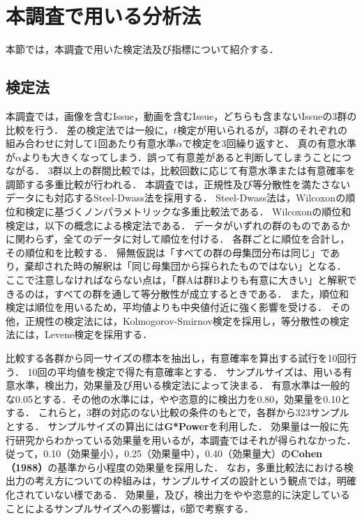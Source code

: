 \section{本調査で用いる分析法\label{method}}
本節では，本調査で用いた検定法及び指標について紹介する．

\subsection{検定法}
本調査では，画像を含むIssue，動画を含むIssue，どちらも含まないIssueの3群の比較を行う．
差の検定法では一般に，$t$検定が用いられるが，3群のそれぞれの組み合わせに対して1回あたり有意水準$\alpha$で検定を3回繰り返すと、
真の有意水準が$\alpha$よりも大きくなってしまう．誤って有意差があると判断してしまうことにつながる．
3群以上の群間比較では，比較回数に応じて有意水準または有意確率を調節する多重比較が行われる．
本調査では，正規性及び等分散性を満たさないデータにも対応するSteel-Dwass法を採用する．
Steel-Dwass法は，Wilcoxonの順位和検定に基づくノンパラメトリックな多重比較法である．
Wilcoxonの順位和検定は，以下の概念による検定法である．
データがいずれの群のものであるかに関わらず，全てのデータに対して順位を付ける．
各群ごとに順位を合計し，その順位和を比較する．
帰無仮説は「すべての群の母集団分布は同じ」であり，棄却された時の解釈は「同じ母集団から採られたものではない」となる．
ここで注意しなければならない点は，「群Aは群Bよりも有意に大きい」と解釈できるのは，すべての群を通して等分散性が成立するときである．\cite{Interpretation_For_Nonparametric_Test}
また，順位和検定は順位を用いるため，平均値よりも中央値付近に強く影響を受ける．
その他，正規性の検定法には，Kolmogorov-Smirnov検定を採用し，等分散性の検定法には，Levene検定を採用する．

比較する各群から同一サイズの標本を抽出し，有意確率を算出する試行を10回行う．
10回の平均値を検定で得た有意確率とする．
サンプルサイズは、用いる有意水準，検出力，効果量及び用いる検定法によって決まる．
有意水準は一般的な0.05とする．その他の水準には，やや恣意的に検出力を0.80，効果量を0.10とする．
これらと，3群の対応のない比較の条件のもとで，各群から323サンプルとする．
サンプルサイズの算出には\textbf{G*Power}\cite{G*Power1}\cite{G*Power2}を利用した．
効果量は一般に先行研究からわかっている効果量を用いるが，本調査ではそれが得られなかった．
従って，0.10（効果量小），0.25（効果量中），0.40（効果量大）の\textbf{Cohen（1988）}の基準から小程度の効果量を採用した．
なお，多重比較法における検出力の考え方についての枠組みは，サンプルサイズの設計という観点では，明確化されていない様である．\cite{Test_Power}
効果量，及び，検出力をやや恣意的に決定していることによるサンプルサイズへの影響は，6節で考察する．



